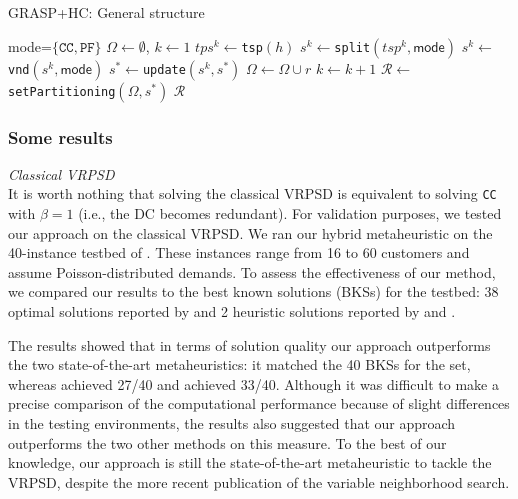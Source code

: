 \begin{algorithm}[h]
\small
\caption{GRASP+HC: General structure}
\label{a.vrpsd.dc.grasp}
\begin{algorithmic}[1]
 \Comment \textsf{mode}=$\{\texttt{CC},\texttt{PF}\}$
    \State $\Omega\leftarrow\emptyset$, $k\leftarrow1$
     \label{a.vrpsd.dc.grasp.start}
            \State $tps^{k}\leftarrow$\verb"tsp"$(h)$ \label{a.vrpsd.dc.grasp.randTSP}
            \State $s^{k}\leftarrow$\verb"split"$(tsp^{k},\textsf{mode})$\label{a.vrpsd.dc.grasp.split}
            \State $s^{k}\leftarrow$\verb"vnd"$(s^{k},\textsf{mode})$\label{a.vrpsd.dc.grasp.vnd}
            \State $s^*\leftarrow$\verb"update"$(s^{k},s^*)$\label{a.vrpsd.dc.grasp.updateBest}
            \label{a.vrpsd.dc.grasp.updateOmega.start}
                \State $\Omega\leftarrow \Omega \cup r$
            \EndFor\label{a.vrpsd.dc.grasp.updateOmega.end}
            \State $k\leftarrow k+1$
        \EndFor
    \EndWhile\label{a.vrpsd.dc.grasp.end}
    \State $\mathcal{R}\leftarrow$ \verb"setPartitioning"$(\Omega,s^*)$\label{a.vrpsd.dc.grasp.hc}
    \State \Return $\mathcal{R}$ \label{a.vrpsd.dc.grasp.return}
\EndFunction
\end{algorithmic}
\end{algorithm}

\subsubsection{Some results}

\noindent \textit{Classical VRPSD}\\
It is worth nothing that solving the classical VRPSD is equivalent to solving \texttt{CC} with $\beta=1$ (i.e., the DC becomes redundant). For validation purposes, we tested our approach on the classical VRPSD. We ran our hybrid metaheuristic on the 40-instance testbed of \citet{Christiansen2007}. These instances range from 16 to 60 customers and assume Poisson-distributed demands. To assess the effectiveness of our method, we compared our results to the best known solutions (BKSs) for the testbed: 38 optimal solutions reported by \cite{Gauvin2012} and 2 heuristic solutions reported by \cite{Goodson2012} and \cite{Mendoza2013}.

The results showed that in terms of solution quality our approach outperforms the two state-of-the-art metaheuristics: it matched the 40 BKSs for the set, whereas \cite{Mendoza2013} achieved 27/40 and \cite{Goodson2012} achieved 33/40. Although it was difficult to make a precise comparison of the computational performance because of slight differences in the testing environments, the results also suggested that our approach outperforms the two other methods on this measure. To the best of our knowledge, our approach is still the state-of-the-art metaheuristic to tackle the VRPSD, despite the more recent publication of the \citeauthor{Sarasola2016} variable neighborhood search.

